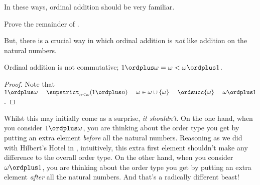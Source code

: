 \documentclass[../../../include/open-logic-section]{subfiles}
\begin{document}
In these ways, ordinal addition should be very familiar. 
\begin{prob}
	Prove the remainder of .
\end{prob}\noindent
But, there is a crucial way in which ordinal addition is \emph{not} like addition on the natural numbers.
\begin{prop}Ordinal addition is {not} commutative; $1 \ordplus  \omega = \omega < \omega \ordplus  1$.
	\begin{proof}
		Note that 
		$
			1 \ordplus  \omega = \supstrict_{n < \omega} (1 \ordplus n) = \omega \in \omega \cup \{\omega\} = \ordsucc{\omega} = \omega \ordplus  1$.
	\end{proof}
\end{prop}\noindent
Whilst this may initially come as a surprise, \emph{it shouldn't}. On the one hand, when you consider $1 \ordplus  \omega$, you are thinking about the order type you get by putting an extra element \emph{before} all the natural numbers. Reasoning as we did with Hilbert's Hotel in , intuitively, this extra first element shouldn't make any difference to the overall order type. On the other hand, when you consider $\omega \ordplus  1$, you are thinking about the order type you get by putting an extra element \emph{after} all the natural numbers. And that's a radically different beast!
\end{document}
